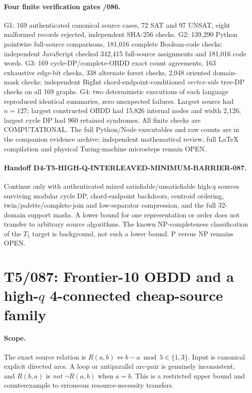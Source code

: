 \documentclass[11pt]{article}
\begin{document}
\paragraph{Four finite verification gates /086.}
G1: 169 authenticated canonical source cases, 72 SAT and 97 UNSAT,
eight malformed records rejected, independent SHA-256 checks.
G2: 139,290 Python pointwise full-source comparisons,
181,016 complete Boolean-code checks; independent JavaScript
checked 342,415 full-source assignments and 181,016 code words.
G3: 169 cycle-DP/complete-OBDD exact count agreements,
163 exhaustive edge-bit checks, 338 alternate forest checks,
2,048 oriented domain-mask checks; independent BigInt
chord-endpoint-conditioned \emph{vertex-side} tree-DP checks on
all 169 graphs. G4: two deterministic executions of each language
reproduced identical summaries, zero unexpected failures.
Largest source had $n=127$; largest constructed OBDD had
15,826 internal nodes and width 2,126; largest cycle DP had
960 retained syndromes. All finite checks are COMPUTATIONAL.
The full Python/Node executables and raw counts are in the
companion evidence archive; independent mathematical review,
full LaTeX compilation and physical Turing-machine microsteps remain OPEN.

\paragraph{Handoff D4-T5-HIGH-Q-INTERLEAVED-MINIMUM-BARRIER-087.}
Continue only with authenticated mixed satisfiable/unsatisfiable
high-$q$ sources surviving modular cycle DP, chord-endpoint
backdoors, centroid ordering, twin/palette/complete-join and
low-separator compression, and the full 32-domain support masks.
A lower bound for one representation or order does not transfer
to arbitrary source algorithms. The known NP-completeness
classification of the $T_5$ target is background, not such a lower
bound. P versus NP remains OPEN.



\section{T5/087: Frontier-10 OBDD and a high-$q$ 4-connected cheap-source family}
\label{sec:t5frontier087}
\paragraph{Scope.}
The exact source relation is $R(a,b)\iff b-a\bmod5\in\{1,3\}$.
Input is canonical explicit directed arcs. A loop or antiparallel
arc-pair is genuinely inconsistent, and $R(b,a)$ is \emph{not}
$\neg R(a,b)$ when $a=b$. This is a restricted upper bound and
counterexample to erroneous resource-necessity transfers.
\end{document}
